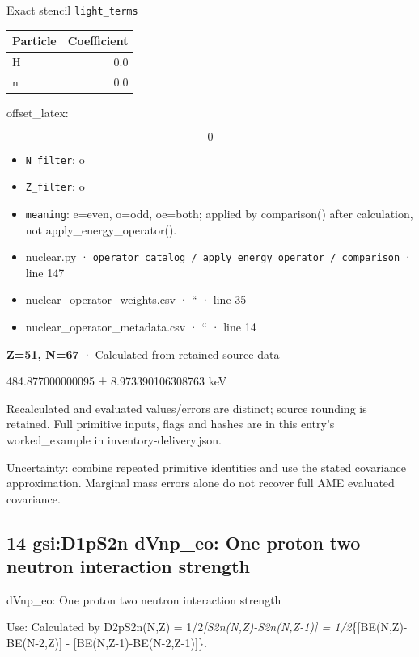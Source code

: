 \documentclass[
  11pt,
  letterpaper,
]{article}
\begin{document}
Exact stencil \texttt{light\_terms}

\begin{longtable}[]{@{}lr@{}}
\toprule\noalign{}
Particle & Coefficient \\
\midrule\noalign{}
\endhead
\bottomrule\noalign{}
\endlastfoot
H & 0.0 \\
n & 0.0 \\
\end{longtable}

offset\_latex:

\[
0
\]

\begin{itemize}
\item
  \texttt{N\_filter}: o
\item
  \texttt{Z\_filter}: o
\item
  \texttt{meaning}: e=even, o=odd, oe=both; applied by comparison()
  after calculation, not apply\_energy\_operator().
\item
  nuclear.py ·
  \texttt{operator\_catalog\ /\ apply\_energy\_operator\ /\ comparison}
  · line 147
\item
  nuclear\_operator\_weights.csv · `` · line 35
\item
  nuclear\_operator\_metadata.csv · `` · line 14
\end{itemize}

\textbf{Z=51, N=67} · Calculated from retained source data

484.877000000095 ± 8.973390106308763 keV

Recalculated and evaluated values/errors are distinct; source rounding
is retained. Full primitive inputs, flags and hashes are in this entry's
worked\_example in inventory-delivery.json.

Uncertainty: combine repeated primitive identities and use the stated
covariance approximation. Marginal mass errors alone do not recover full
AME evaluated covariance.

\subsection{14 gsi:D1pS2n dVnp\_eo: One proton two neutron interaction
strength}\label{gsid1ps2n-dvnp_eo-one-proton-two-neutron-interaction-strength}

dVnp\_eo: One proton two neutron interaction strength

Use: Calculated by D2pS2n(N,Z) = 1/2\emph{{[}S2n(N,Z)-S2n(N,Z-1){]} =
1/2}\{{[}BE(N,Z)-BE(N-2,Z){]} - {[}BE(N,Z-1)-BE(N-2,Z-1){]}\}.
\end{document}

